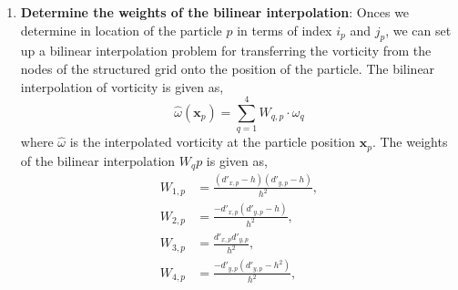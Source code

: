 \begin{enumerate}[label=4.\alph*)]
	\item \textbf{Determine the weights of the bilinear interpolation}: Onces we determine in location of the particle $p$ in terms of index $i_p$ and $j_p$, we can set up a bilinear interpolation problem for transferring the vorticity from the nodes of the structured grid onto the position of the particle. The bilinear interpolation of vorticity is given as,
		\begin{equation}
		\hat{\omega}(\mathbf{x}_p) = \sum_{q=1}^4 W_{q,p}\cdot \omega_q
		\label{eq:coupling-interpolationtoblobs}
		\end{equation}
	where $\hat{\omega}$ is the interpolated vorticity at the particle position $\mathbf{x}_p$. The weights of the bilinear interpolation $W_qp$ is given as,
		\begin{equation}
		\begin{aligned}
		W_{1,p} &= \frac{(d'_{x,p} - h )({d}'_{y,p}- h)}{h^2},\\
		W_{2,p} &= \frac{-{d}'_{x,p}({d}'_{y,p}-h)}{h^2},\\
		W_{3,p} &= \frac{{d}'_{x,p} {d}'_{y,p}}{h^2},\\
		W_{4,p} &= \frac{-{d}'_{y,p}({d}'_{y,p} - h^2 )}{h^2},
		\end{aligned}
		\end{equation}
	

\end{enumerate}
